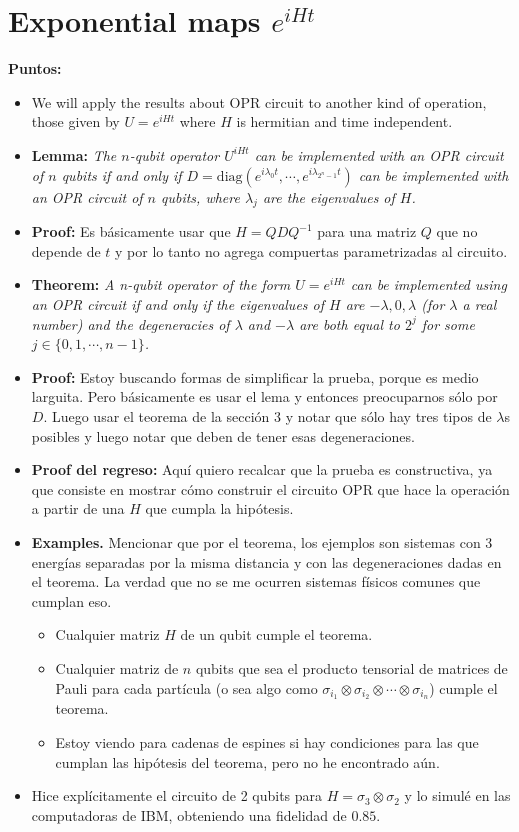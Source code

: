 \documentclass[10pt,letterpaper]{article}
\begin{document}
\section*{Exponential maps $e^{iHt}$}
\label{sec: Exponential maps}
\textbf{Puntos:}

\begin{itemize}
\item We will apply the results about OPR circuit to another kind of operation, those given by $U  = e^{iHt}$ where $H$ is hermitian  and time independent.
\item \textbf{Lemma:}\textit{ The $n$-qubit operator $U^{iHt}$ can be implemented with an OPR circuit of $n$ qubits if and only if $D = \text{diag}(e^{i\lambda_0 t}, \cdots, e^{i \lambda_{2^n-1}t})$ can be implemented with an OPR circuit of $n$ qubits, where $\lambda_j$ are the eigenvalues of $H$.}
\item \textbf{Proof:}  Es b\'asicamente usar que $H = QDQ^{-1}$ para una matriz $Q$ que no depende de $t$ y por lo tanto no agrega compuertas parametrizadas al circuito. 
\item \textbf{Theorem:} \textit{ A n-qubit operator of the form $U = e^{iHt}$ can be implemented using an OPR circuit if and only if the eigenvalues of $H$ are $-\lambda,0,\lambda$ (for $\lambda$ a real number) and the degeneracies of $\lambda$ and $-\lambda$ are both equal to $2^j$ for some $j\in \{0,1,\cdots,n-1\}$.}
\item \textbf{Proof:} Estoy buscando formas de simplificar la prueba, porque es medio larguita. Pero básicamente es usar el lema y entonces preocuparnos sólo por $D$. Luego  usar el teorema de la sección 3 y notar que sólo hay tres tipos de  $\lambda$s posibles y luego notar que deben de tener esas degeneraciones.
\item \textbf{Proof del regreso:} Aquí quiero recalcar que la prueba es constructiva, ya que consiste en mostrar cómo construir el circuito OPR que hace la operación a partir de una $H$ que cumpla la hipótesis. 
\item \textbf{Examples.} Mencionar que por el teorema, los ejemplos son sistemas con 3 energías separadas por la misma distancia y con las degeneraciones dadas en el teorema. 
La verdad que no se me ocurren sistemas físicos comunes que cumplan eso.
\begin{itemize}
\item Cualquier matriz $H$ de un qubit cumple el teorema.
\item Cualquier matriz de $n$ qubits que sea el producto tensorial de matrices de Pauli para cada partícula (o sea algo como $\sigma_{i_1} \otimes \sigma_{i_2} \otimes \cdots \otimes \sigma_{i_n}$) cumple el teorema.
\item Estoy viendo para cadenas de espines si hay condiciones para las que cumplan las hipótesis del teorema, pero no he encontrado aún.
\end{itemize}
\item Hice explícitamente el circuito de 2 qubits para $H = \sigma_3 \otimes \sigma_2$ y lo simulé en las computadoras de IBM, obteniendo una fidelidad de $0.85$.
\end{itemize}
\end{document}
